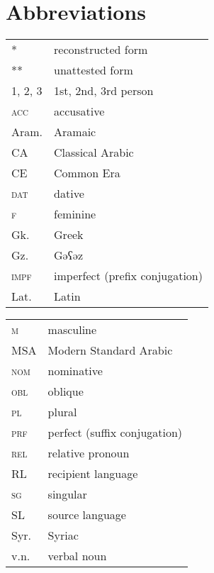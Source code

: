 \documentclass[output=paper]{langsci/langscibook}
\begin{document}
\section*{Abbreviations}
\begin{tabularx}{.5\textwidth}{@{}lQ@{}}
*             &  reconstructed form\\
**            &  unattested form\\
\textsc {1, 2, 3} & 1st, 2nd, 3rd person \\
\textsc{acc}  &  accusative\\
Aram.         &  Aramaic\\
CA            &  Classical Arabic\\
CE            &  Common Era\\
\textsc{dat}  &  dative\\
\textsc{f}    &  feminine\\
Gk.           &  Greek\\
Gz.           &  Gəʕəz\\
\textsc{impf} &  imperfect (prefix conjugation)\\
Lat.           &  Latin\\
\end{tabularx}%
\begin{tabularx}{.5\textwidth}{@{}lQ@{}}
\textsc{m}    &  masculine\\
MSA           &  Modern Standard Arabic\\
\textsc{nom}  &  nominative\\
\textsc{obl}  &  oblique\\
\textsc{pl}   &  plural\\
\textsc{prf}  &  perfect (suffix conjugation)\\
\textsc{rel}  &  relative pronoun\\
RL          &  recipient language\\
\textsc{sg}   &  singular\\
SL          &  source language\\
Syr.          &  Syriac\\
v.n.         &  verbal noun\\
\end{tabularx}%


{\sloppy\printbibliography[heading=subbibliography,notkeyword=this]}
\end{document}
